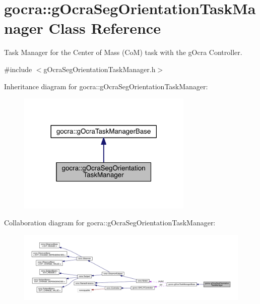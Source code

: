 \hypertarget{classgocra_1_1gOcraSegOrientationTaskManager}{}\section{gocra\+:\+:g\+Ocra\+Seg\+Orientation\+Task\+Manager Class Reference}
\label{classgocra_1_1gOcraSegOrientationTaskManager}


Task Manager for the Center of Mass (CoM) task with the g\+Ocra Controller.  




{\ttfamily \#include $<$g\+Ocra\+Seg\+Orientation\+Task\+Manager.\+h$>$}



Inheritance diagram for gocra\+:\+:g\+Ocra\+Seg\+Orientation\+Task\+Manager\+:\nopagebreak
\begin{figure}[H]
\begin{center}
\leavevmode
\includegraphics[width=237pt]{d0/d24/classgocra_1_1gOcraSegOrientationTaskManager__inherit__graph}
\end{center}
\end{figure}


Collaboration diagram for gocra\+:\+:g\+Ocra\+Seg\+Orientation\+Task\+Manager\+:
\nopagebreak
\begin{figure}[H]
\begin{center}
\leavevmode
\includegraphics[width=350pt]{de/d46/classgocra_1_1gOcraSegOrientationTaskManager__coll__graph}
\end{center}
\end{figure}
